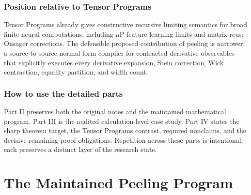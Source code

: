 \documentclass[11pt,oneside]{report}
\begin{document}
\section{Position relative to Tensor Programs}

Tensor Programs already gives constructive recursive limiting semantics for
broad finite neural computations, including $\mu$P feature-learning limits
and matrix-reuse Onsager corrections.  The defensible proposed contribution of
peeling is narrower: a source-to-source normal-form compiler for contracted
derivative observables that explicitly executes every derivative expansion,
Stein correction, Wick contraction, equality partition, and width count.

\section{How to use the detailed parts}

Part II preserves both the original notes and the maintained mathematical
program.  Part III is the audited calculation-level case study.  Part IV
states the sharp theorem target, the Tensor Programs contrast, required
nonclaims, and the decisive remaining proof obligations.  Repetition across
these parts is intentional: each preserves a distinct layer of the research
state.



\part{The Maintained Peeling Program}
\end{document}
